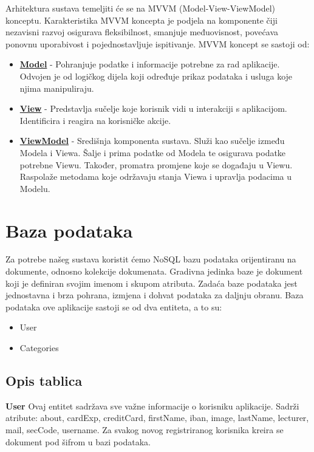 		Arhitektura sustava temeljiti će se na MVVM (Model-View-ViewModel) konceptu. Karakteristika MVVM koncepta je podjela na komponente čiji nezavisni razvoj osigurava fleksibilnost, smanjuje međuovisnost, povećava ponovnu uporabivost i pojednostavljuje ispitivanje. \newline
		MVVM koncept se sastoji od:
	\begin{itemize}
		\item \textbf{\underline{Model}} - Pohranjuje podatke i informacije potrebne za rad aplikacije. Odvojen je od logičkog dijela koji određuje prikaz podataka i usluga koje njima manipuliraju.
		\item \textbf{\underline{View}} - Predstavlja sučelje koje korisnik vidi u interakciji s aplikacijom. Identificira i reagira na korisničke akcije.
		\item \textbf{\underline{ViewModel}} - Središnja komponenta sustava. Služi kao sučelje između Modela i Viewa. Šalje i prima podatke od Modela te osigurava podatke potrebne Viewu. Također, promatra promjene koje se događaju u Viewu. Raspolaže metodama koje održavaju stanja Viewa i upravlja podacima u Modelu.
	\end{itemize}
		
	\eject

				
		\section{Baza podataka}
			
			\text Za potrebe našeg sustava koristit ćemo NoSQL bazu podataka orijentiranu na dokumente, odnosno kolekcije dokumenata. Gradivna jedinka baze je dokument koji je definiran svojim imenom i skupom atributa. Zadaća baze podataka jest jednostavna i brza pohrana, izmjena i dohvat podataka za daljnju obranu. Baza podataka ove aplikacije sastoji se od dva entiteta, a to su:
			
			\begin{itemize}
				\item User
				\item Categories
			\end{itemize}
		
			\subsection{Opis tablica}
			

				\textbf{User} \text    Ovaj entitet sadržava sve važne informacije o korisniku aplikacije. Sadrži atribute: about, cardExp, creditCard, firstName, iban, image, lastName, lecturer, mail, secCode, username. Za svakog novog registriranog korisnika kreira se dokument pod šifrom u bazi podataka.
				
